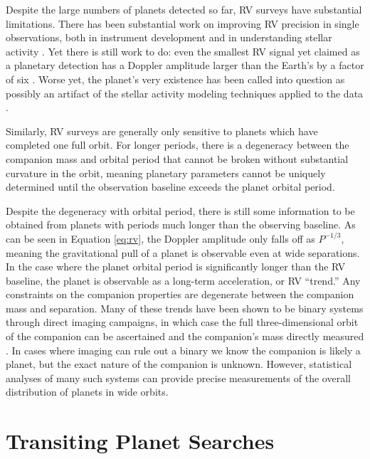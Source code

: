 \documentclass[12pt]{caltech_thesis}
\begin{document}
Despite the large numbers of planets detected so far, RV surveys have substantial
limitations.
There has been substantial work on improving RV precision in single observations, both
in instrument development and in understanding stellar activity \citep{Fischer16}.
Yet there is still work to do: even the smallest RV signal yet claimed as a planetary
detection has a Doppler amplitude larger than the Earth's by a factor of six
\citep{Dumusque12}. 
Worse yet, the planet's very existence has been called into question as possibly 
an artifact of the stellar activity modeling techniques applied to the data
\citep{Rajpaul16}.

Similarly, RV surveys are generally only sensitive to planets which have completed
one full orbit.
For longer periods, there is a degeneracy between the companion mass and orbital period
that cannot be broken without substantial curvature in the orbit, meaning planetary
parameters cannot be uniquely determined until the observation baseline exceeds the
planet orbital period.

Despite the degeneracy with orbital period, there is still some information to be
obtained from planets with periods much longer than the observing baseline.
As can be seen in Equation \ref{eq:rv}, the Doppler amplitude only falls off as $P^{-1/3}$,
meaning the gravitational pull of a planet is observable even at wide separations.
In the case where the planet orbital period is significantly longer than the RV baseline,
the planet is observable as a long-term acceleration, or RV ``trend.''
Any constraints on the companion properties are degenerate between the companion mass
and separation.
Many of these trends have been shown to be binary systems through direct imaging campaigns, in which case the full three-dimensional orbit of the companion can be 
ascertained and the companion's mass directly measured \citep{Crepp12b, Crepp13a, Crepp13b}.
In cases where imaging can rule out a binary we know the companion is likely a planet,
but the exact nature of the companion is unknown. 
However, statistical analyses of many such systems can provide precise measurements of
the overall distribution of planets in wide orbits.


\section{Transiting Planet Searches}
\end{document}
